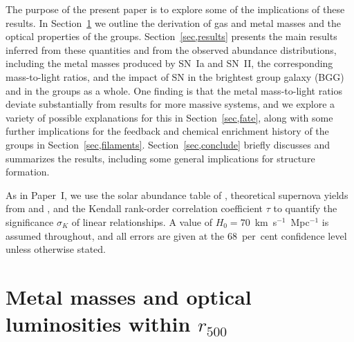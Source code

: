 \documentclass[useAMS,usenatbib]{mn2e}
\begin{document}
The purpose of the present paper is to explore some of the
implications of these results. In Section~\ref{sec,est} we outline the
derivation of gas and metal masses and the optical properties of the
groups.  Section~\ref{sec,results} presents the main results inferred
from these quantities and from the observed abundance distributions,
including the metal masses produced by SN~Ia and SN~II, the
corresponding mass-to-light ratios, and the impact of SN in the
brightest group galaxy (BGG) and in the groups as a whole. One finding
is that the metal mass-to-light ratios deviate substantially from
results for more massive systems, and we explore a variety of possible
explanations for this in Section~\ref{sec,fate}, along with some
further implications for the feedback and chemical enrichment history
of the groups in Section~\ref{sec,filaments}.
Section~\ref{sec,conclude} briefly discusses and summarizes the
results, including some general implications for structure formation.

As in Paper~I, we use the solar abundance table of \citet{grev98},
theoretical supernova yields from \citet{iwam99} and \citet{nomo06},
and the Kendall rank-order correlation coefficient $\tau$ to quantify
the significance $\sigma_K$ of linear relationships.  A value of
$H_0=70$~km~s$^{-1}$~Mpc$^{-1}$ is assumed throughout, and all errors
are given at the 68~per~cent confidence level unless otherwise stated.
 



\section{Metal masses and optical luminosities within $r_{500}$}\label{sec,est}
\end{document}
